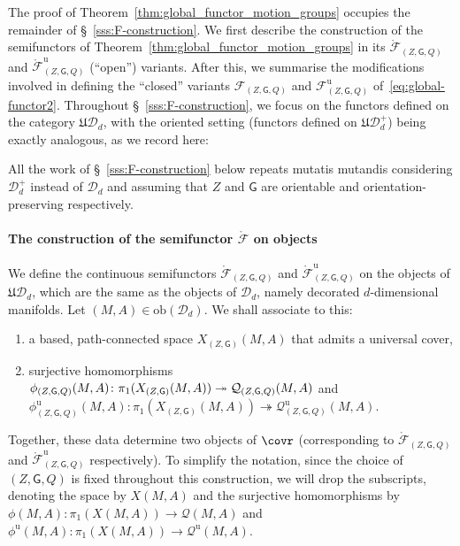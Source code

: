 \documentclass[AHL,Unicode,published]{cedram}
\newcommand{\obj}{\ensuremath{\mathrm{ob}}}
\newcommand{\Int}{\mathring}
\newcommand{\unt}{\mathrm{u}}
\newcommand{\fU}{\ensuremath{\mathfrak{U}}}
\newcommand{\sG}{\mathsf{G}}
\newcommand{\cD}{\mathcal{D}}
\newcommand{\cF}{\mathcal{F}}
\newcommand{\cQ}{\mathcal{Q}}
\newcommand*{\romanenumi}{\renewcommand*{\theenumi}{\roman{enumi}}}
\begin{document}
The proof of Theorem~\ref{thm:global_functor_motion_groups} occupies the remainder of \S~\ref{sss:F-construction}. We first describe the construction of the semifunctors of Theorem~\ref{thm:global_functor_motion_groups} in its $\Int{\cF}_{(Z,\sG,Q)}$ and $\Int{\cF}^{\unt}_{(Z,\sG,Q)}$ (``open'') variants. After this, we summarise the modifications involved in defining the ``closed'' variants $\cF_{(Z,\sG,Q)}$ and $\cF^{\unt}_{(Z,\sG,Q)}$ of~\eqref{eq:global-functor2}. Throughout \S~\ref{sss:F-construction}, we focus on the functors defined on the category $\fU\cD_{d}$, with the oriented setting (functors defined on $\fU\cD_{d}^{+}$) being exactly analogous, as we record here:

\begin{prop}
All the work of \S~\ref{sss:F-construction} below repeats mutatis mutandis considering $\cD_{d}^{+}$ instead of $\cD_{d}$ and assuming that $Z$ and $\sG$ are orientable and orientation-preserving respectively.
\end{prop}


\paragraph*{The construction of the semifunctor \texorpdfstring{$\Int{\cF}$}{F} on objects}

We define the continuous semifunctors $\Int{\cF}_{(Z,\sG,Q)}$ and $\Int{\cF}^{\unt}_{(Z,\sG,Q)}$ on the objects of $\fU\cD_{d}$, which are the same as the objects of $\cD_{d}$, namely decorated $d$-dimensional manifolds. Let $(M,A) \in \obj(\cD_{d})$. We shall associate to this:
\begin{enumerate}\romanenumi
\item\label{objects-step-1}
a based, path-connected space $X_{(Z,\sG)}(M,A)$ that admits a universal cover,
\item\label{objects-step-2}
surjective homomorphisms $\phi_{(Z,\sG,Q)}(M,A) \colon \pi_{1}(X_{(Z,\sG)}(M,A)) \twoheadrightarrow \cQ_{(Z,\sG,Q)}\newline(M,A)$ and $\phi^{\unt}_{(Z,\sG,Q)}(M,A) \colon \pi_{1}(X_{(Z,\sG)}(M,A)) \twoheadrightarrow \cQ^{\unt}_{(Z,\sG,Q)}(M,A)$.
\end{enumerate}
Together, these data determine two objects of $\covr$ (corresponding to $\Int{\cF}_{(Z,\sG,Q)}$ and $\Int{\cF}^{\unt}_{(Z,\sG,Q)}$ respectively). To simplify the notation, since the choice of $(Z,\sG,Q)$ is fixed throughout this construction, we will drop the subscripts, denoting the space by $X(M,A)$ and the surjective homomorphisms by $\phi(M,A) \colon \pi_{1}(X(M,A)) \to \cQ(M,A)$ and $\phi^{\unt}(M,A) \colon \pi_{1}(X(M,A)) \to \cQ^{\unt}(M,A)$.
\end{document}

